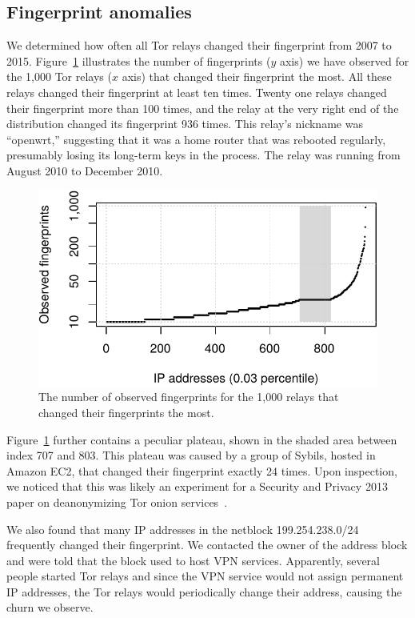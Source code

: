 \subsection{Fingerprint anomalies}
\label{sec:fingerprints}
We determined how often all Tor relays changed their fingerprint from 2007 to
2015.  Figure~\ref{fig:fingerprints} illustrates the number of fingerprints ($y$
axis) we have observed for the 1,000 Tor relays ($x$ axis) that changed their
fingerprint the most.  All these relays changed their fingerprint at least ten
times.  Twenty one relays changed their fingerprint more than 100 times, and the
relay at the very right end of the distribution changed its fingerprint 936
times.  This relay's nickname was ``openwrt,'' suggesting that it was a home
router that was rebooted regularly, presumably losing its long-term keys in the
process.  The relay was running from August 2010 to December 2010.

\begin{figure}[t]
	\centering
	\includegraphics[width=0.9\linewidth]{diagrams/fingerprints.pdf}
	\caption{The number of observed fingerprints for the 1,000 relays that
	changed their fingerprints the most.}
	\label{fig:fingerprints}
\end{figure}

Figure~\ref{fig:fingerprints} further contains a peculiar plateau, shown in the
shaded area between index 707 and 803.  This plateau was caused by a group of
Sybils, hosted in Amazon EC2, that changed their fingerprint exactly 24 times.
Upon inspection, we noticed that this was likely an experiment for a Security
and Privacy 2013 paper on deanonymizing Tor onion services~\cite{Biryukov2013a}.

We also found that many IP addresses in the netblock 199.254.238.0/24
frequently changed their fingerprint.  We contacted the owner of the address
block and were told that the block used to host VPN services.  Apparently,
several people started Tor relays and since the VPN service would not assign
permanent IP addresses, the Tor relays would periodically change their address,
causing the churn we observe.

